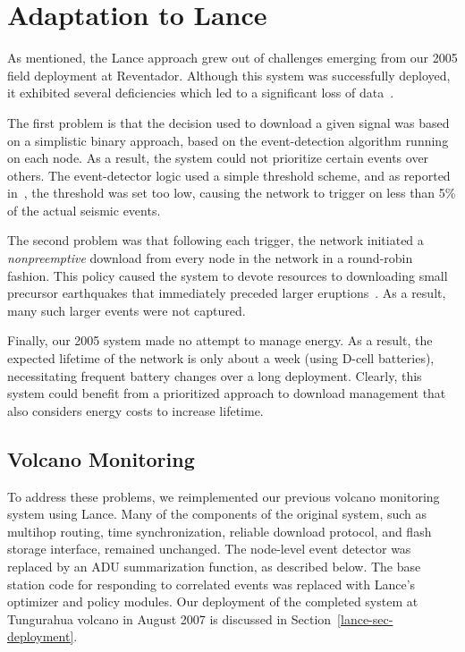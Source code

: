 \section{Adaptation to Lance}
\label{lance-sec-adaptation}

As mentioned, the Lance approach grew out of challenges emerging from our
2005 field deployment at Reventador. Although this system was successfully
deployed, it exhibited several deficiencies which led to a significant loss
of data~\cite{volcano-osdi06}. 

The first problem is that the decision used to download a given signal was
based on a simplistic binary approach, based on the event-detection algorithm
running on each node. As a result, the system could not prioritize certain
events over others. The event-detector logic used a simple threshold scheme,
and as reported in~\cite{volcano-osdi06}, the threshold was set too low,
causing the network to trigger on less than 5\% of the actual seismic events.

The second problem was that following each trigger, the network initiated a
{\em nonpreemptive} download from every node in the network in a round-robin
fashion. This policy caused the system to devote resources to downloading
small precursor earthquakes that immediately preceded larger
eruptions~\cite{volcano-osdi06}. As a result, many such larger events were
not captured. 

Finally, our 2005 system made no attempt to manage energy. As a result,
the expected lifetime of the network is only about a week (using D-cell
batteries), necessitating frequent battery changes over a long deployment.
Clearly, this system could benefit from a prioritized approach to download
management that also considers energy costs to increase lifetime.

\subsection{Volcano Monitoring}

To address these problems, we reimplemented our previous volcano monitoring
system using Lance. Many of the components of the original system, such as
multihop routing, time synchronization, reliable download protocol, and flash
storage interface, remained unchanged.  The node-level event detector was
replaced by an ADU summarization function, as described below. The base
station code for responding to correlated events was replaced with Lance's
optimizer and policy modules. Our deployment of the completed system at
Tungurahua volcano in August 2007 is discussed in
Section~\ref{lance-sec-deployment}.

